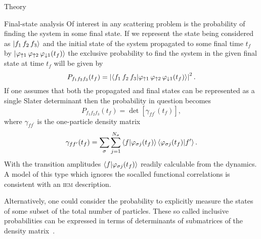 \documentclass[aps, pra, reprint, groupedaddress, amsfonts,
               amsmath, amssymb, showpacs, nofootinbib]{revtex4-1}
\begin{document}
\begin{section}{Theory \label{sec:theory}}
\begin{subsection}{Final-state analysis \label{sec:probs}}
      Of interest in any scattering problem is the probability of finding the system in some final state.
      If we represent the state being considered as $\ket{f_1 \, f_2 \, f_3}$ and the initial state of
      the system propagated to some final time $t_f$ by $\ket{\varphi_{ \uparrow 1} \,
      \varphi_{\uparrow 2} \, \varphi_{\downarrow 1} (t_f)}$ the exclusive probability to find the
      system in the given final state at time $t_f$ will be given by
      \begin{equation} \label{eq:finalProb}
         P_{f_1 f_2 f_3}(t_f) = \left| \braket{ f_1 \, f_2 \, f_3 | \varphi_{ \uparrow 1} \,
                                       \varphi_{\uparrow 2} \, \varphi_{\downarrow 1} (t_f) } \right|^2.
      \end{equation}
      If one assumes that both the propagated and final states can be represented as a single Slater
      determinant then the probability in question becomes
      \begin{equation} \label{eq:detProb}
         P_{f_1 f_2 f_3}(t_f) = \det \left[ \gamma_{f f^\prime}(t_f) \right],
      \end{equation}
      where $\gamma_{f f^\prime}$ is the one-particle density matrix
      \begin{equation} \label{eq:denmat}
         \gamma_{f f^\prime}(t_f) = \sum\limits_{\sigma} \sum\limits_{j = 1}^{N_\sigma}
                               \braket{f | \varphi_{\sigma j}(t_f)}
                               \braket{\varphi_{\sigma j}(t_f) | f^\prime}.
      \end{equation}
      With the transition amplitudes $\braket{f | \varphi_{\sigma j}(t_f)}$ readily calculable from the
      dynamics. A model of this type which ignores the socalled functional correlations is consistent
      with an \textsc{iem} description.

      Alternatively, one could consider the probability to explicitly measure the states of some subset
      of the total number of particles. These so called inclusive probabilities can be expressed in
      terms of determinants of submatrices of the density matrix~\cite{inc-prob}.
 

\end{subsection}
\end{section}
\end{document}
